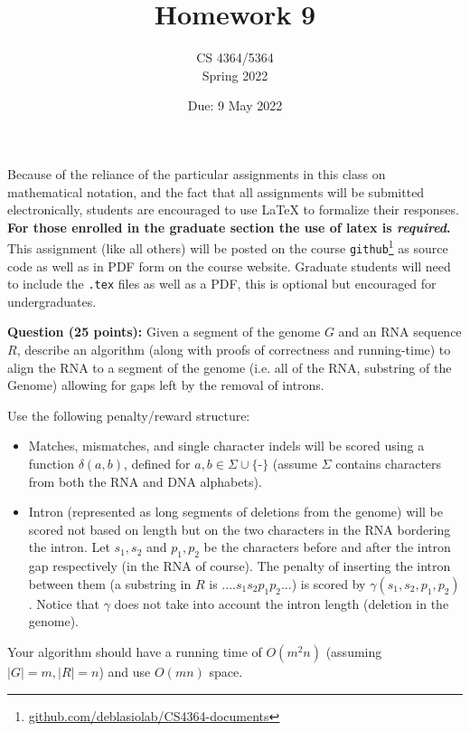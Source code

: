 \documentclass[11pt, oneside]{article}   	%
\title{Homework 9}
\author{CS 4364/5364\\Spring 2022}
\date{Due: 9 May 2022}							%
\begin{document}
\maketitle

Because of the reliance of the particular assignments in this class on mathematical notation, 
and the fact that all assignments will be submitted electronically, 
students are encouraged to use \LaTeX{} to formalize their responses. 
\textbf{For those enrolled in the graduate section the use of latex is \emph{required}.}
This assignment (like all others) will be posted on the course \texttt{github}\footnote{\url{github.com/deblasiolab/CS4364-documents}} as source code as well as in PDF form on the course website. 
Graduate students will need to include the \texttt{.tex} files as well as a PDF, this is optional but encouraged for undergraduates. 

\textbf{Question (25 points):} 
Given a segment of the genome $G$ and an RNA sequence $R$, 
describe an algorithm (along with proofs of correctness and running-time) 
to align the RNA to a segment of the genome (i.e. all of the RNA, substring of the Genome) 
allowing for gaps left by the removal of introns. 

Use the following penalty/reward structure: 
\begin{itemize}
\item Matches, mismatches, and single character indels will be scored using a function $\delta(a,b)$, defined for $a,b \in \Sigma \cup \{\texttt{-}\}$ 
(assume $\Sigma$ contains characters from both the RNA and DNA alphabets).
\item Intron (represented as long segments of deletions from the genome) will be scored not based on length but on the two characters in the RNA bordering the intron. 
Let $s_1,s_2$ and $p_1,p_2$ be the characters before and after the intron gap respectively (in the RNA of course). 
The penalty of inserting the intron between them (a substring in $R$ is $....s_1s_2p_1p_2...$) is scored by $\gamma(s_1,s_2,p_1,p_2)$.
Notice that $\gamma$ does not take into account the intron length (deletion in the genome). 
\end{itemize}

Your algorithm should have a running time of $O(m^2n)$ (assuming $|G|=m,|R|=n$) and use $O(mn)$ space.
\end{document}
